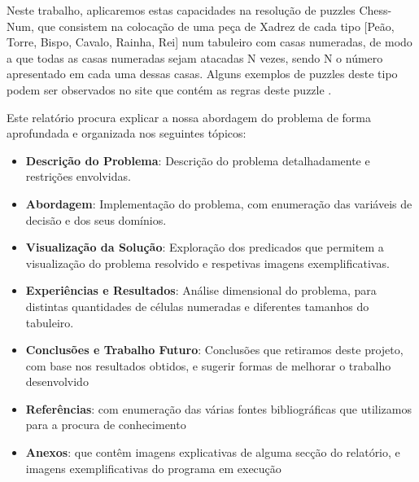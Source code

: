\documentclass[runningheads]{llncs}
\begin{document}
Neste trabalho, aplicaremos estas capacidades na resolução de puzzles Chess-Num, que consistem na colocação de uma peça de Xadrez de cada tipo [Peão, Torre, Bispo, Cavalo, Rainha, Rei] 
num tabuleiro com casas numeradas, de modo a que todas as casas numeradas sejam atacadas N vezes, sendo N o número apresentado em cada uma dessas casas. 
Alguns exemplos de puzzles deste tipo podem ser observados no site que contém as regras deste puzzle \cite{chessnum}.

\newpage
Este relatório procura explicar a nossa abordagem do problema de forma aprofundada e organizada nos seguintes tópicos:

\begin{itemize}
    \item \textbf{Descrição do Problema}: Descrição do problema detalhadamente e restrições envolvidas.
    \item \textbf{Abordagem}: Implementação do problema, com enumeração das variáveis de decisão e dos seus domínios.
    \item \textbf{Visualização da Solução}: Exploração dos predicados que permitem a visualização do problema resolvido e respetivas imagens exemplificativas.
    \item \textbf{Experiências e Resultados}: Análise dimensional do problema, para distintas quantidades de células numeradas e diferentes tamanhos do tabuleiro. 
    \item \textbf{Conclusões e Trabalho Futuro}: Conclusões que retiramos deste projeto, com base nos resultados obtidos, e sugerir formas de melhorar o trabalho desenvolvido
    \item \textbf{Referências}: com enumeração das várias fontes bibliográficas que utilizamos para a procura de conhecimento
    \item \textbf{Anexos}: que contêm imagens explicativas de alguma secção do relatório, e imagens exemplificativas do programa em execução
\end{itemize}
\end{document}

